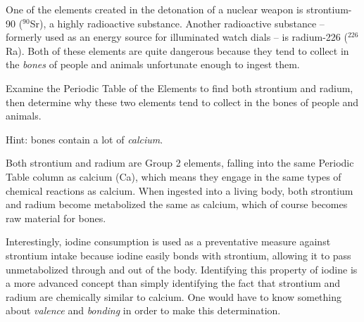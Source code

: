 
One of the elements created in the detonation of a nuclear weapon is strontium-90 ($^{90}$Sr), a highly radioactive substance.  Another radioactive substance -- formerly used as an energy source for illuminated watch dials -- is radium-226 ($^{226}$Ra).  Both of these elements are quite dangerous because they tend to collect in the {\it bones} of people and animals unfortunate enough to ingest them.

Examine the Periodic Table of the Elements to find both strontium and radium, then determine why these two elements tend to collect in the bones of people and animals.







Hint: bones contain a lot of {\it calcium}.







Both strontium and radium are Group 2 elements, falling into the same Periodic Table column as calcium (Ca), which means they engage in the same types of chemical reactions as calcium.  When ingested into a living body, both strontium and radium become metabolized the same as calcium, which of course becomes raw material for bones.

\vskip 10pt

Interestingly, iodine consumption is used as a preventative measure against strontium intake because iodine easily bonds with strontium, allowing it to pass unmetabolized through and out of the body.  Identifying this property of iodine is a more advanced concept than simply identifying the fact that strontium and radium are chemically similar to calcium.  One would have to know something about {\it valence} and {\it bonding} in order to make this determination.




